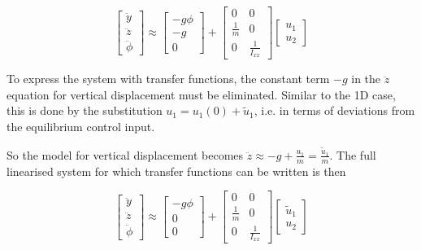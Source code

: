\documentclass[a4paper]{report}
\begin{document}
\begin{equation}  \label{eq:planar_nonlin_sys}
\begin{bmatrix}
\ddot{y} \\
\ddot{z}\\
\ddot{\phi}
\end{bmatrix}
\approx
\begin{bmatrix}
-g\phi \\
-g\\
0
\end{bmatrix}
+
\begin{bmatrix}
0 & 0 \\
\frac{1}{m} & 0 \\
0 & \frac{1}{I_{xx}}
\end{bmatrix}
\begin{bmatrix}
u_1 \\
u_2
\end{bmatrix} 
\end{equation}

To express the system with transfer functions, the constant term $-g$ in the $\ddot{z}$ equation for vertical displacement must be eliminated.
Similar to the 1D case, this is done by the substitution $u_1 = u_1(0) + \tilde{u}_1$, i.e. in terms of deviations from the equilibrium control input.

So the model for vertical displacement becomes $\ddot{z} \approx -g+\frac{u_1}{m} = \frac{\tilde{u}_1 }{m} $.
The full linearised system for which transfer functions can be written is then

\begin{equation} \label{eq:planar_lin_sys}
\begin{bmatrix}
\ddot{y} \\
\ddot{z}\\
\ddot{\phi}
\end{bmatrix}
\approx
\begin{bmatrix}
-g\phi \\
0\\
0
\end{bmatrix}
+
\begin{bmatrix}
0 & 0 \\
\frac{1}{m} & 0 \\
0 & \frac{1}{I_{xx}}
\end{bmatrix}
\begin{bmatrix}
\tilde{u}_1 \\
u_2
\end{bmatrix}
\end{equation}
\end{document}
